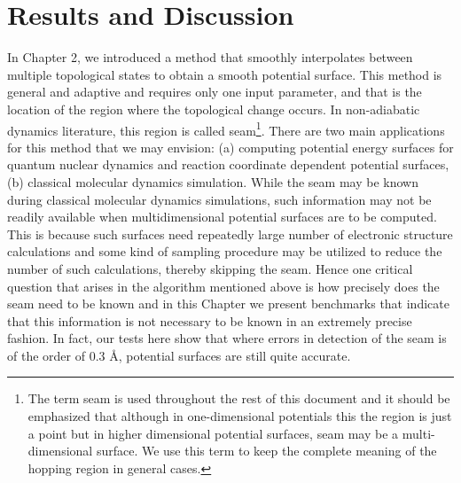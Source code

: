 \chapter{Results and Discussion}
{\label {chapter3}}
In Chapter 2, we introduced a method that smoothly interpolates between multiple topological
states to obtain a smooth potential surface. This method is general and adaptive and requires
only one input parameter, and that is the location of the region where the topological change
occurs. In non-adiabatic dynamics literature, this region is called seam\footnote{The term
seam is used throughout the rest of this document and it should be emphasized that although
in one-dimensional potentials this the region is just a point but in higher dimensional
potential surfaces, seam may be a multi-dimensional surface. We use this term to keep the
complete meaning of the hopping region in general cases.}. There are two main
applications for this method that we may envision: (a) computing
potential energy surfaces for quantum nuclear dynamics and reaction coordinate dependent
potential surfaces,(b) classical molecular dynamics simulation. While the seam may be known
during classical molecular dynamics simulations, such information may not be readily
available when multidimensional potential surfaces are to be computed. This is because such
surfaces need repeatedly large number of electronic structure calculations and some kind of
sampling procedure may be utilized to reduce the number of such calculations, thereby skipping
the seam. Hence one critical question that arises in the algorithm mentioned above is how
precisely does the seam need to be known and in this Chapter we present benchmarks
that indicate that this information is not necessary to be known in an extremely precise
fashion. In fact, our tests here show that where errors in detection of the seam
is of the order of 0.3 \AA, potential surfaces are still quite accurate.

